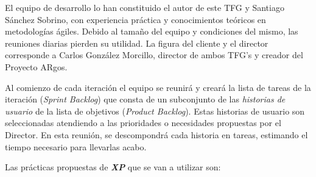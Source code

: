 El  equipo  de  desarrollo  lo  han constituido el autor de este TFG y Santiago Sánchez Sobrino, con  experiencia  práctica y conocimientos teóricos en metodologías ágiles. Debido  al  tamaño  del  equipo  y  condiciones  del  mismo,  las  reuniones  diarias pierden su utilidad. La figura del cliente y el director corresponde a Carlos González Morcillo, director de ambos TFG's y creador del Proyecto ARgos. 

Al comienzo de cada iteración el equipo se reunirá y creará la lista de tareas de la iteración (\textit{Sprint Backlog}) que consta de un subconjunto de las \textit{historias de usuario} de la lista de objetivos (\textit{Product Backlog}). Estas historias de usuario son seleccionadas atendiendo a las prioridades o necesidades propuestas por el Director. En esta reunión, se descompondrá cada historia en tareas, estimando el tiempo necesario para llevarlas acabo. 

Las prácticas propuestas de \textbf{\textit{XP}} que se van a utilizar son: 

